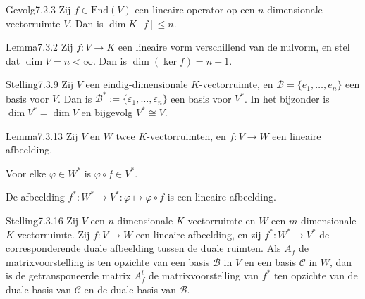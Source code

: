 \begin{res}{Gevolg}{7.2.3}
Zij $f\in\mathrm{End}(V)$ een lineaire operator op een $n$-dimensionale vectorruimte $V$. Dan is $\dim K[f]\le n$.
\end{res}

\begin{res}{Lemma}{7.3.2}
Zij $f:V\to K$ een lineaire vorm verschillend van de nulvorm, en stel dat $\dim V=n<\infty$. Dan is $\dim(\ker f)=n-1$.
\end{res}

\begin{res}{Stelling}{7.3.9}
Zij $V$ een eindig-dimensionale $K$-vectorruimte, en $\mathcal B=\{e_1,\dots,e_n\}$ een basis voor $V$. Dan is $\mathcal B^*:=\{\varepsilon_1,\dots,\varepsilon_n\}$ een basis voor $V^*$. In het bijzonder is $\dim V^*=\dim V$ en bijgevolg $V^*\cong V$.
\end{res}

\begin{res}{Lemma}{7.3.13}
Zij $V$ en $W$ twee $K$-vectorruimten, en $f:V\to W$ een lineaire afbeelding.
\begin{myenum}
\item Voor elke $\varphi\in W^*$ is $\varphi\circ f\in V^*$.
\item De afbeelding $f^*:W^*\to V^*:\varphi\mapsto\varphi\circ f$ is een lineaire afbeelding.
\end{myenum}
\end{res}

\begin{res}{Stelling}{7.3.16}
Zij $V$ een $n$-dimensionale $K$-vectorruimte en $W$ een $m$-dimensionale $K$-vectorruimte. Zij $f:V\to W$ een lineaire afbeelding, en zij $f^*:W^*\to V^*$ de corresponderende duale afbeelding tussen de duale ruimten. Als $A_f$ de matrixvoorstelling is ten opzichte van een basis $\mathcal B$ in $V$ en een basis $\mathcal C$ in $W$, dan is de getransponeerde matrix $A_f^t$ de matrixvoorstelling van $f^*$ ten opzichte van de duale basis van $\mathcal C$ en de duale basis van $\mathcal B$.
\end{res}